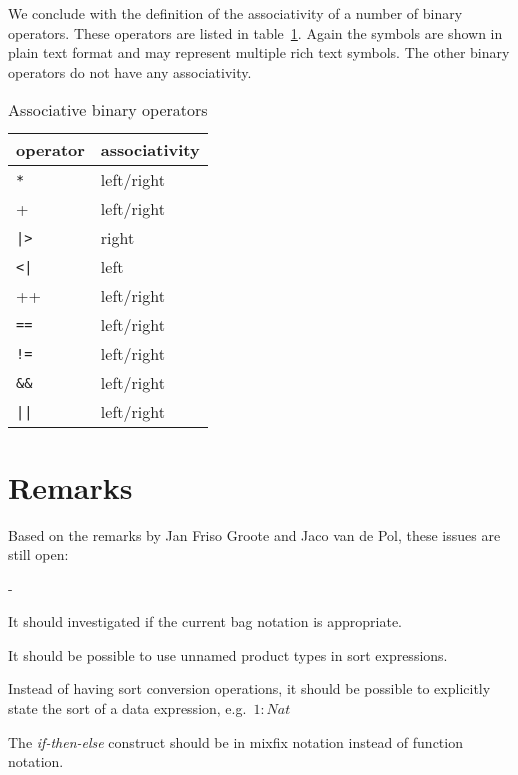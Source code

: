 \documentclass[a4paper,fleqn]{article}
\newenvironment{tdefinitions}[2][0.15em]
  {\begin{list}%
    {#2}%
    {\setlength{\parsep}{0pt}%
     \setlength{\itemsep}{#1}%
     \setlength{\leftmargin}{\mathindent}%
     \setlength{\labelwidth}{\mathindent - \labelsep}%
    }
  }
  {\end{list}}
\newcommand{\frm}[1]{\mbox{\ensuremath{#1}}}
\newcommand{\f}[1]{\ensuremath{\mathit{#1}}}
\newlength{\tlength}
\begin{document}
We conclude with the definition of the associativity of a number of binary operators. These operators are listed in table~\ref{tab:associativity}. Again the symbols are shown in plain text format and may represent multiple rich text symbols. The other binary operators do not have any associativity.
\begin{table}[h!bt]
\centering
\begin{tabular}{|ll|}
\hline
operator        & associativity\\\hline
\verb+*+        & left/right\\
\verb+++        & left/right\\
\verb+|>+       & right\\
\verb+<|+       & left\\
\verb++++       & left/right\\
\verb+==+       & left/right\\
\verb+!=+       & left/right\\
\verb+&&+       & left/right\\
\verb+||+       & left/right\\\hline
\end{tabular}
\caption{Associative binary operators}
\label{tab:associativity}
\end{table}

\section{Remarks}

Based on the remarks by Jan Friso Groote and Jaco van de Pol, these issues are still open:
\begin{tdefinitions}{-}
\item It should investigated if the current bag notation is appropriate.
\item It should be possible to use unnamed product types in sort expressions.
\item Instead of having sort conversion operations, it should be possible to explicitly state the sort of a data expression, e.g.\ \frm{1: \f{Nat}}
\item The \emph{if-then-else} construct should be in mixfix notation instead of function notation.
\end{tdefinitions}
\end{document}
